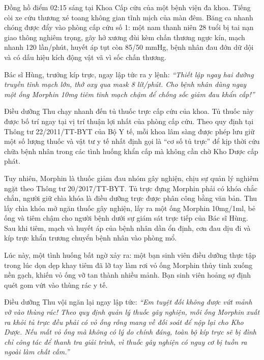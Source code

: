 \documentclass[12pt,a4paper]{article}
\begin{document}
Đồng hồ điểm 02:15 sáng tại Khoa Cấp cứu của một bệnh viện đa khoa. Tiếng còi xe cứu thương xé toang không gian tĩnh mịch của màn đêm. Băng ca nhanh chóng được đẩy vào phòng cấp cứu số 1: một nam thanh niên 28 tuổi bị tai nạn giao thông nghiêm trọng, gãy hở xương đùi kèm chấn thương ngực kín, mạch nhanh 120 lần/phút, huyết áp tụt còn 85/50 mmHg, bệnh nhân đau đớn dữ dội và có dấu hiệu kích động vật vã vì sốc chấn thương.

Bác sĩ Hùng, trưởng kíp trực, ngay lập tức ra y lệnh: \textit{``Thiết lập ngay hai đường truyền tĩnh mạch lớn, thở oxy qua mask 8 lít/phút. Cho bệnh nhân dùng ngay một ống Morphin 10mg tiêm tĩnh mạch chậm để chống sốc giảm đau khẩn cấp!''}

Điều dưỡng Thu chạy nhanh đến tủ thuốc trực cấp cứu của khoa. Tủ thuốc này được bố trí ngay tại vị trí thuận lợi nhất của phòng cấp cứu. Theo quy định tại Thông tư 22/2011/TT-BYT của Bộ Y tế, mỗi khoa lâm sàng được phép lưu giữ một số lượng thuốc và vật tư y tế nhất định gọi là ``cơ số tủ trực'' để kịp thời cứu chữa bệnh nhân trong các tình huống khẩn cấp mà không cần chờ Kho Dược cấp phát.

Tuy nhiên, Morphin là thuốc giảm đau nhóm gây nghiện, chịu sự quản lý nghiêm ngặt theo Thông tư 20/2017/TT-BYT. Tủ trực đựng Morphin phải có khóa chắc chắn, người giữ chìa khóa là điều dưỡng trực được phân công bằng văn bản. Thu lấy chìa khóa mở ngăn thuốc gây nghiện, lấy ra một ống Morphin 10mg/1ml, bẻ ống và tiêm chậm cho người bệnh dưới sự giám sát trực tiếp của Bác sĩ Hùng. Sau khi tiêm, mạch và huyết áp của bệnh nhân dần ổn định, cơn đau dịu đi và kíp trực khẩn trương chuyển bệnh nhân vào phòng mổ.

Lúc này, một tình huống bất ngờ xảy ra: một bạn sinh viên điều dưỡng thực tập trong lúc dọn dẹp khay tiêm đã lỡ tay làm rơi vỏ ống Morphin thủy tinh xuống nền gạch, khiến vỏ ống vỡ tan thành nhiều mảnh. Bạn sinh viên hoảng sợ định quét gom vứt vào thùng rác y tế.

Điều dưỡng Thu vội ngăn lại ngay lập tức: \textit{``Em tuyệt đối không được vứt mảnh vỡ vào thùng rác! Theo quy định quản lý thuốc gây nghiện, mỗi ống Morphin xuất ra khỏi tủ trực đều phải có vỏ ống rỗng mang về đối soát để nộp lại cho Kho Dược. Nếu mất vỏ ống mà không có lý do chính đáng, toàn bộ kíp trực sẽ bị đình chỉ công tác để thanh tra giải trình, vì thuốc gây nghiện có nguy cơ bị tuồn ra ngoài làm chất cấm.''}
\end{document}
